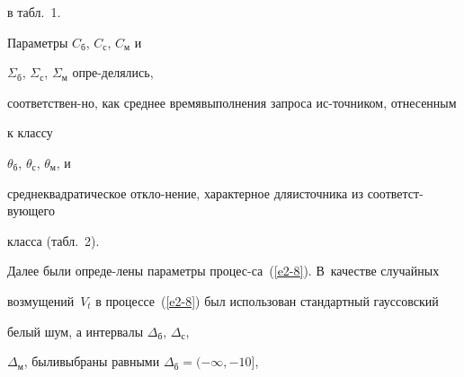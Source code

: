 \renewcommand{\tablename}{\protect\small\bf Таблица }


\renewcommand{\figurename}{\protect\small\bf Рис. }





\addtocounter{table}{1}


\setcounter{figure}{1}





\noindent


 в табл.~1. 


Параметры $C_{\mathrm{б}}$, $C_{\mathrm{с}}$, $C_{\mathrm{м}}$ и 


$\Sigma_{\mathrm{б}}$, $\Sigma_{\mathrm{с}}$, $\Sigma_{\mathrm{м}}$ опре-\linebreak делялись, 


соответ\-ст\-вен-\linebreak но, как среднее вре\-мя\linebreak выполнения запроса ис-\linebreak точником, отнесенным 


 к клас\-су 


$\theta_{\mathrm{б}}$, $\theta_{\mathrm{с}}$, $\theta_{\mathrm{м}}$, и 


среднеквадратическое откло-\linebreak нение, характерное для\linebreak источника из соответст-\linebreak вующего 


класса (табл.~2).


      











      


      Далее были опреде-\linebreak ле\-ны параметры процес-\linebreak са~(\ref{e2-8}). В~качестве случайных 


возмущений~$V_t$ в процессе~(\ref{e2-8}) был использован стандартный гауссовский 


белый шум, а интервалы $\Delta_{\mathrm{б}}$, $\Delta_{\mathrm{с}}$, 


$\Delta_{\mathrm{м}}$, были\linebreak выбраны равными $\Delta_{\mathrm{б}}=(-\infty, -10]$, 


